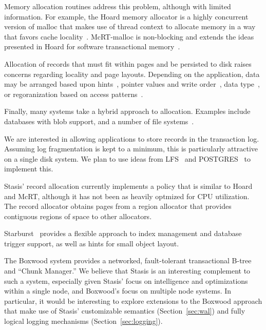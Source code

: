 \documentclass[letterpaper,twocolumn,10pt]{article}
\newcommand{\yad}{Stasis\xspace}
\newcommand{\yads}{Stasis'\xspace}
\newcommand{\rcs}[1]{\textcolor{green}{\bf RCS: #1}}
\begin{document}
Memory allocation routines address this problem, although with limited
information.  For example, the Hoard memory allocator is a highly
concurrent version of malloc that makes use of thread context to
allocate memory in a way that favors cache locality~\cite{hoard}.
McRT-malloc is non-blocking and extends the ideas
presented in Hoard for software transactional memory~\cite{mcrt}.

Allocation of records that must fit within pages and be persisted to
disk raises concerns regarding locality and page layouts.  Depending
on the application, data may be arranged based upon
hints~\cite{cricket}, pointer values and write order~\cite{starburst},
data type~\cite{orion}, or regoranization based on access
patterns~\cite{storageReorganization}.


Finally, many systems take a hybrid approach to allocation.  Examples include
databases with blob support, and a number of
file systems~\cite{reiserfs,ffs}.

We are interested in allowing applications to store records in
the transaction log.  Assuming log fragmentation is kept to a
minimum, this is particularly attractive on a single disk system.  We
plan to use ideas from LFS~\cite{lfs} and POSTGRES~\cite{postgres}
to implement this.

\yads record allocation currently implements a policy that is similar
to Hoard and McRT, although it has not been as heavily optmized for
CPU utilization.  The record allocator obtains pages from a region
allocator that provides contiguous regions of space to other
allocators.

Starburst~\cite{starburst} provides a flexible approach to index
management and database trigger support, as well as hints for small
object layout.

The Boxwood system provides a networked, fault-tolerant transactional
B-tree and ``Chunk Manager.''  We believe that \yad is an interesting
complement to such a system, especially given \yads focus on
intelligence and optimizations within a single node, and Boxwood's
focus on multiple node systems.  In particular, it would be
interesting to explore extensions to the Boxwood approach that make
use of \yads customizable semantics (Section~\ref{sec:wal}) and fully
logical logging mechanisms (Section~\ref{sec:logging}).
\end{document}
